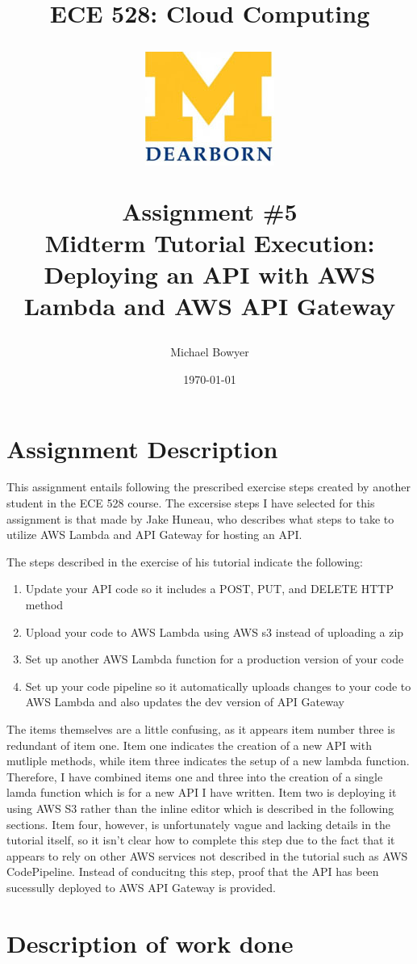 \documentclass[12pt, letterpaper, final, onecolumn, titlepage] {article}
\title{ECE 528: Cloud Computing \\
	\vspace{1.5cm}
   		\begin{center}\includegraphics{umlogo} \end{center}
	\vspace{1.5cm}
	\textbf{Assignment \#5} \\
Midterm Tutorial Execution: Deploying an API with AWS Lambda and AWS API Gateway}
\author{Michael Bowyer}
\date{\today}
\begin{document}
\maketitle

\doublespacing

\section{Assignment Description}

This assignment entails following the prescribed exercise steps created by another student in the ECE 528 course. The excersise steps I have selected for this assignment is that made by Jake Huneau, who describes what steps to take to utilize AWS Lambda and API Gateway for hosting an API.

The steps described in the exercise of his tutorial indicate the following:
\begin{enumerate}
	\item Update your API code so it includes a POST, PUT, and DELETE HTTP method
	\item Upload your code to AWS Lambda using AWS s3 instead of uploading a zip
	\item Set up another AWS Lambda function for a production version of your code
	\item Set up your code pipeline so it automatically uploads changes to your code to AWS Lambda and also updates the dev version of API Gateway
\end{enumerate}

The items themselves are a little confusing, as it appears item number three is redundant of item one. Item one indicates the creation of a new API with mutliple methods, while item three indicates the setup of a new lambda function. Therefore, I have combined items one and three into the creation of a single lamda function which is for a new API I have written. Item two is deploying it using AWS S3 rather than the inline editor which is described in the following sections. Item four, however, is unfortunately vague and lacking details in the tutorial itself, so it isn't clear how to complete this step due to the fact that it appears to rely on other AWS services not described in the tutorial such as AWS CodePipeline. Instead of conducitng this step, proof that the API has been sucessully deployed to AWS API Gateway is provided.

\section{Description of work done}
\end{document}
